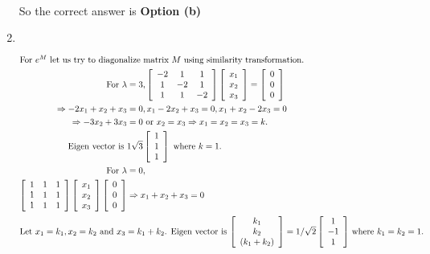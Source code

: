 \begin{enumerate}
\begin{answer}
\begin{align*}
		\end{align*}
	So the correct answer is \textbf{Option (b)}		
	\end{answer}
	\item $\left. \right. $	
	\begin{answer}
		\begin{align*}
		\intertext{For $e^{M}$ let us try to diagonalize matrix $M$ using similarity transformation.}
		\text{For }\lambda&=3,\left[\begin{array}{ccc}-2 & 1 & 1 \\ 1 & -2 & 1 \\ 1 & 1 & -2\end{array}\right]\left[\begin{array}{l}x_{1} \\ x_{2} \\ x_{3}\end{array}\right]=\left[\begin{array}{l}0 \\ 0 \\ 0\end{array}\right]\\
		\Rightarrow-2 x_{1}+x_{2}+x_{3}&=0, x_{1}-2 x_{2}+x_{3}=0, x_{1}+x_{2}-2 x_{3}=0 \\
		\Rightarrow-3 x_{2}+3 x_{3}&=0 \text { or } x_{2}=x_{3} \Rightarrow x_{1}=x_{2}=x_{3}=k .\\
		\text{Eigen vector is }&1 \sqrt{3}\left[\begin{array}{l}1 \\ 1 \\ 1\end{array}\right]\text{ where }k=1.\\
	\text{	For }\lambda&=0,\\
		\left[\begin{array}{lll}1 & 1 & 1 \\ 1 & 1 & 1 \\ 1 & 1 & 1\end{array}\right]\left[\begin{array}{l}x_{1} \\ x_{2} \\ x_{3}\end{array}\right]\left[\begin{array}{l}0 \\ 0 \\ 0\end{array}\right] &\Rightarrow x_{1}+x_{2}+x_{3}=0\\
		\intertext{Let $x_{1}=k_{1}, x_{2}=k_{2}$ and $x_{3}=k_{1}+k_{2}$. Eigen vector is $\left[\begin{array}{c}k_{1} \\ k_{2} \\ \left(k_{1}+k_{2}\right)\end{array}\right]=1 / \sqrt{2}\left[\begin{array}{c}1 \\ -1 \\ 1\end{array}\right]$ where $k_{1}=k_{2}=1$.}

\end{align*}
\end{answer}
\end{enumerate}
